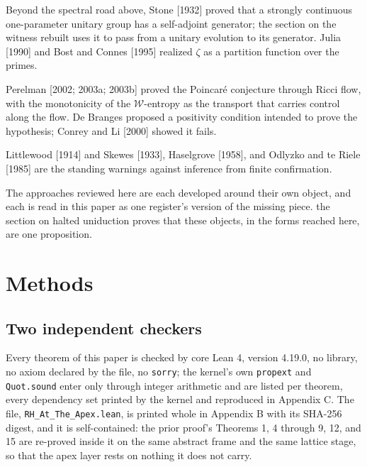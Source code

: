 \documentclass[10pt]{article}
\begin{document}
Beyond the spectral road above, Stone {[}1932{]} proved that a strongly
continuous one-parameter unitary group has a self-adjoint generator; the
section on the witness rebuilt uses it to pass from a unitary evolution
to its generator. Julia {[}1990{]} and Bost and Connes {[}1995{]}
realized \(\zeta\) as a partition function over the primes.

Perelman {[}2002; 2003a; 2003b{]} proved the Poincaré conjecture through
Ricci flow, with the monotonicity of the \(\mathcal W\)-entropy as the
transport that carries control along the flow. De Branges proposed a
positivity condition intended to prove the hypothesis; Conrey and Li
{[}2000{]} showed it fails.

Littlewood {[}1914{]} and Skewes {[}1933{]}, Haselgrove {[}1958{]}, and
Odlyzko and te Riele {[}1985{]} are the standing warnings against
inference from finite confirmation.

The approaches reviewed here are each developed around their own object,
and each is read in this paper as one register's version of the missing
piece. the section on halted uniduction proves that these objects, in
the forms reached here, are one proposition.

\hypertarget{methods}{%
\section{Methods}\label{methods}}

\hypertarget{two-independent-checkers}{%
\subsection{Two independent checkers}\label{two-independent-checkers}}

Every theorem of this paper is checked by core Lean 4, version 4.19.0,
no library, no axiom declared by the file, no \texttt{sorry}; the
kernel's own \texttt{propext} and \texttt{Quot.sound} enter only through
integer arithmetic and are listed per theorem, every dependency set
printed by the kernel and reproduced in Appendix C. The file,
\texttt{RH\_At\_The\_Apex.lean}, is printed whole in Appendix B with its
SHA-256 digest, and it is self-contained: the prior proof's Theorems 1,
4 through 9, 12, and 15 are re-proved inside it on the same abstract
frame and the same lattice stage, so that the apex layer rests on
nothing it does not carry.
\end{document}
